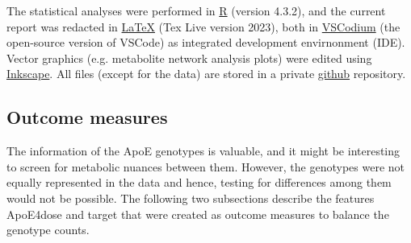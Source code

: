 \documentclass{amsart}
\begin{document}
The statistical analyses were performed in \href{https://www.r-project.org}{\textsf{R}} (version 4.3.2), and the current report was redacted in \href{https://ctan.org/tex}{\LaTeX}  (Tex Live version 2023), both in \href{https://vscodium.com}{\textsf{VSCodium}} (the open-source version of VSCode) as integrated development envirnonment (IDE). Vector graphics (e.g. metabolite network analysis plots) were edited using \href{https://inkscape.org}{\textsf{Inkscape}}. All files (except for the data) are stored in a private \href{https://github.com}{\textsf{github}} repository.

\newpage \subsection{Outcome measures}\label{featureeng}
The information of the ApoE genotypes is valuable, and it might be interesting to screen for metabolic nuances between them. However, the genotypes were not equally represented in the data and hence, testing for differences among them would not be possible. The following two subsections describe the features ApoE4dose and target that were created as outcome measures to balance the genotype counts.
\end{document}
